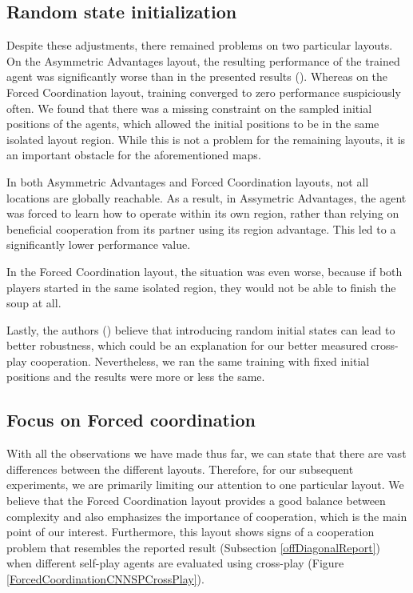   


\subsection{Random state initialization}
Despite these adjustments, there remained problems on two particular layouts.
On the Asymmetric Advantages layout, the resulting performance of the trained agent was significantly worse than in the presented results (\cite{carroll2020utility}).
Whereas on the Forced Coordination layout, training converged to zero performance suspiciously often.
We found that there was a missing constraint on the sampled initial positions of the agents, which allowed the initial positions to be in the same isolated layout region.
While this is not a problem for the remaining layouts, it is an important obstacle for the aforementioned maps.

In both Asymmetric Advantages and Forced Coordination layouts, not all locations are globally reachable.
As a result, in Assymetric Advantages, the agent was forced to learn how to operate within its own region, rather than relying on beneficial cooperation from its partner using its region advantage.
This led to a significantly lower performance value.

In the Forced Coordination layout, the situation was even worse, because if both players started in the same isolated region, they would not be able to finish the soup at all.

Lastly, the authors (\cite{knott2021evaluating}) believe that introducing random initial states can lead to better robustness, which could be an explanation for our better measured cross-play cooperation.
Nevertheless, we ran the same training with fixed initial positions and the results were more or less the same.

\subsection{Focus on Forced coordination}
With all the observations we have made thus far, we can state that there are vast differences between the different layouts. 
Therefore, for our subsequent experiments, we are primarily limiting our attention to one particular layout.
We believe that the Forced Coordination layout provides a good balance between complexity and also emphasizes the importance of cooperation, which is the main point of our interest.
Furthermore, this layout shows signs of a cooperation problem that resembles the reported result (Subsection \ref{offDiagonalReport}) when different self-play agents are evaluated using cross-play (Figure \ref{ForcedCoordinationCNNSPCrossPlay}).

